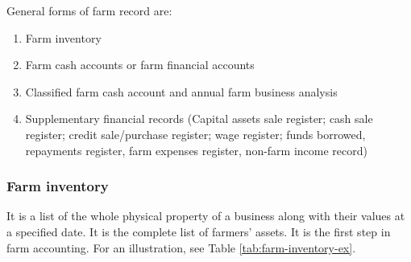 \documentclass[
]{article}
\providecommand{\tightlist}{%
  \setlength{\itemsep}{0pt}\setlength{\parskip}{0pt}}
\begin{document}
General forms of farm record are:

\begin{enumerate}
\def\labelenumi{\arabic{enumi}.}
\tightlist
\item
  Farm inventory
\item
  Farm cash accounts or farm financial accounts
\item
  Classified farm cash account and annual farm business analysis
\item
  Supplementary financial records (Capital assets sale register; cash sale register; credit sale/purchase register; wage register; funds borrowed, repayments register, farm expenses register, non-farm income record)
\end{enumerate}

\hypertarget{farm-inventory}{%
\subsubsection*{Farm inventory}\label{farm-inventory}}

It is a list of the whole physical property of a business along with their values at a specified date. It is the complete list of farmers' assets. It is the first step in farm accounting. For an illustration, see Table \ref{tab:farm-inventory-ex}.

\begingroup\fontsize{8}{10}\selectfont
\end{document}
